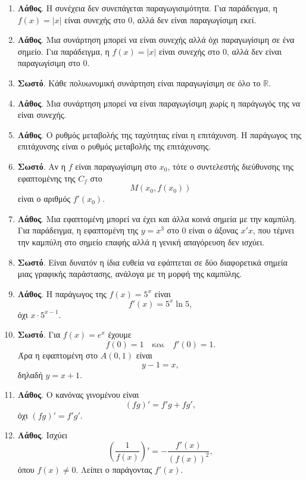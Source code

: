 \begin{enumerate}[label=\textbf{2.\arabic*.}]
\item \textbf{Λάθος}. Η συνέχεια δεν συνεπάγεται παραγωγισιμότητα. Για παράδειγμα, η $f(x)=|x|$ είναι συνεχής στο $0$, αλλά δεν είναι παραγωγίσιμη εκεί.

\item \textbf{Λάθος}. Μια συνάρτηση μπορεί να είναι συνεχής αλλά όχι παραγωγίσιμη σε ένα σημείο. Για παράδειγμα, η $f(x)=|x|$ είναι συνεχής στο $0$, αλλά δεν είναι παραγωγίσιμη στο $0$.

\item \textbf{Σωστό}. Κάθε πολυωνυμική συνάρτηση είναι παραγωγίσιμη σε όλο το $\mathbb{R}$.

\item \textbf{Λάθος}. Μια συνάρτηση μπορεί να είναι παραγωγίσιμη χωρίς η παράγωγός της να είναι συνεχής.

\item \textbf{Λάθος}. Ο ρυθμός μεταβολής της ταχύτητας είναι η επιτάχυνση. Η παράγωγος της επιτάχυνσης είναι ο ρυθμός μεταβολής της επιτάχυνσης.

\item \textbf{Σωστό}. Αν η $f$ είναι παραγωγίσιμη στο $x_0$, τότε ο συντελεστής διεύθυνσης της εφαπτομένης της $C_f$ στο
\[
M(x_0,f(x_0))
\]
είναι ο αριθμός $f'(x_0)$.

\item \textbf{Λάθος}. Μια εφαπτομένη μπορεί να έχει και άλλα κοινά σημεία με την καμπύλη. Για παράδειγμα, η εφαπτομένη της $y=x^3$ στο $0$ είναι ο άξονας $x'x$, που τέμνει την καμπύλη στο σημείο επαφής αλλά η γενική απαγόρευση δεν ισχύει.

\item \textbf{Σωστό}. Είναι δυνατόν η ίδια ευθεία να εφάπτεται σε δύο διαφορετικά σημεία μιας γραφικής παράστασης, ανάλογα με τη μορφή της καμπύλης.

\item \textbf{Λάθος}. Η παράγωγος της $f(x)=5^x$ είναι
\[
f'(x)=5^x\ln5,
\]
όχι $x\cdot5^{x-1}$.

\item \textbf{Σωστό}. Για $f(x)=e^x$ έχουμε
\[
f(0)=1
\quad\text{και}\quad
f'(0)=1.
\]
Άρα η εφαπτομένη στο $A(0,1)$ είναι
\[
y-1=x,
\]
δηλαδή $y=x+1$.

\item \textbf{Λάθος}. Ο κανόνας γινομένου είναι
\[
(fg)'=f'g+fg',
\]
όχι $(fg)'=f'g'$.

\item \textbf{Λάθος}. Ισχύει
\[
\left(\frac{1}{f(x)}\right)'=-\frac{f'(x)}{(f(x))^2},
\]
όπου $f(x)\neq0$. Λείπει ο παράγοντας $f'(x)$.


\end{enumerate}
